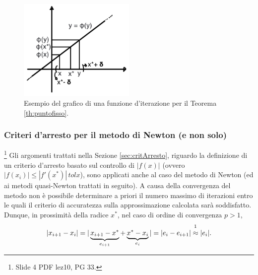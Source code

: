 \addtocounter{footnote}{-1}


\begin{figure}
	\centering
	\includegraphics[width=0.5\textwidth]{immagini/TeoremaPuntoFisso.png}
	\caption{\label{fig:TeoremaPuntoFisso}Esempio del grafico di una funzione d'iterazione per il Teorema \ref{th:puntofisso}.}
\end{figure}

\subsubsection{Criteri d'arresto per il metodo di Newton (e non solo)}
\footnote{Slide 4 PDF lez10, PG 33.}
Gli argomenti trattati nella Sezione \ref{sec:critArresto}, riguardo la definizione di un criterio d'arresto basato sul controllo di $|f(x)|$ (ovvero $|f(x_i)|\leq|f'(x^*)|\, tolx$), sono applicati anche al caso del metodo di Newton (ed ai metodi quasi-Newton trattati in seguito). A causa della convergenza del metodo non è possibile determinare a priori il numero massimo di iterazioni entro le quali il criterio di accuratezza sulla approssimazione calcolata sarà soddisfatto. Dunque, in prossimità della radice $x^*$, nel caso di ordine di convergenza $p>1$,
\begin{equation}\label{eq:approxErroreNewton}
	|x_{i+1}-x_i|=|\underbrace{x_{i+1}-x^*}_{\text{$e_{i+1}$}}+\underbrace{x^*-x_i}_{\text{$e_{i}$}}|=|e_i-e_{i+1}|\overset{\footnotemark}{\approx}|e_i|.
\end{equation}

